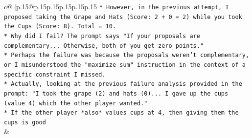 \documentclass{article}
\begin{document}
{\begin{supertabular}{c@{$\;$}|p{.15\linewidth}@{}p{.15\linewidth}p{.15\linewidth}p{.15\linewidth}p{.15\linewidth}p{.15\linewidth}}
{{{\texttt{*   However, in the previous attempt, I proposed taking the Grape and Hats (Score: 2 + 0 = 2) while you took the Cups (Score: 8). Total = 10.} \\
\texttt{*   Why did I fail? The prompt says "If your proposals are complementary... Otherwise, both of you get zero points."} \\
\texttt{*   Perhaps the failure was because the proposals weren't complementary, or I misunderstood the "maximize sum" instruction in the context of a specific constraint I missed.} \\
\texttt{*   Actually, looking at the previous failure analysis provided in the prompt: "I took the grape (2) and hats (0)... I gave up the cups (value 4) which the other player wanted."} \\
\texttt{*   If the other player *also* values cups at 4, then giving them the cups is good} \\
            }
        }
    }
    & \\ \\


\end{supertabular}}
\end{document}
